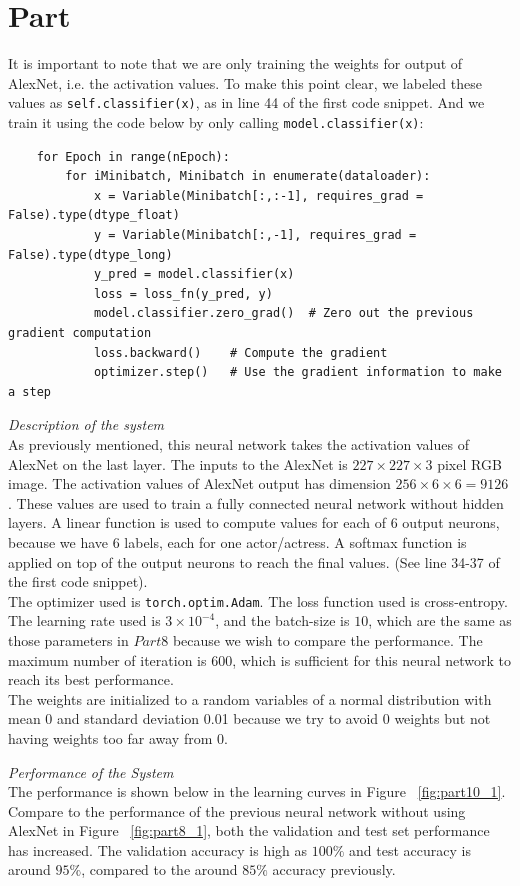 \documentclass{article}
\newcommand{\enterProblemHeader}[1]{
}
\newcommand{\exitProblemHeader}[1]{
}
\newcounter{homeworkProblemCounter} %
\newcommand{\homeworkProblemName}{}
\newenvironment{homeworkProblem}[1][Part \arabic{homeworkProblemCounter}]{ %
\stepcounter{homeworkProblemCounter} %
\renewcommand{\homeworkProblemName}{#1} %
\section{\homeworkProblemName} %
\enterProblemHeader{\homeworkProblemName} %
}{
\exitProblemHeader{\homeworkProblemName} %
}
\begin{document}
\begin{homeworkProblem}
It is important to note that we are only training the weights for output of AlexNet, i.e. the activation values. To make this point clear, we labeled these values as \texttt{self.classifier(x)}, as in line 44 of the first code snippet. And we train it using the code below by only calling \texttt{model.classifier(x)}:
\begin{lstlisting}
    for Epoch in range(nEpoch):
        for iMinibatch, Minibatch in enumerate(dataloader):
            x = Variable(Minibatch[:,:-1], requires_grad = False).type(dtype_float)
            y = Variable(Minibatch[:,-1], requires_grad = False).type(dtype_long)
            y_pred = model.classifier(x)
            loss = loss_fn(y_pred, y)
            model.classifier.zero_grad()  # Zero out the previous gradient computation
            loss.backward()    # Compute the gradient
            optimizer.step()   # Use the gradient information to make a step
\end{lstlisting}

\noindent \textit{Description of the system}
\\[5pt]
As previously mentioned, this neural network takes the activation values of AlexNet on the last layer. The inputs to the AlexNet is $227\times227\times3$ pixel RGB image. The activation values of AlexNet output has dimension $256\times6\times6 = 9126$. These values are used to train a fully connected neural network without hidden layers. A linear function is used to compute values for each of $6$ output neurons, because we have $6$ labels, each for one actor/actress. A softmax function is applied on top of the output neurons to reach the final values. (See line 34-37 of the first code snippet). 
\\
The optimizer used is \texttt{torch.optim.Adam}. The loss function used is cross-entropy.
\\
The learning rate used is $3\times10^{-4}$, and the batch-size is $10$, which are the same as those parameters in $Part 8$ because we wish to compare the performance. The maximum number of iteration is $600$, which is sufficient for this neural network to reach its best performance.
\\
The weights are initialized to a random variables of a normal distribution with mean 0 and standard deviation 0.01 because we try to avoid 0 weights but not having weights too far away from 0.

\clearpage

\noindent \textit{Performance of the System}
\\[5pt]
The performance is shown below in the learning curves in Figure ~\ref{fig:part10_1}. Compare to the performance of the previous neural network without using AlexNet in Figure ~\ref{fig:part8_1}, both the validation and test set performance has increased. The validation accuracy is high as $100\%$ and test accuracy is around $95\%$, compared to the around $85\%$ accuracy previously.


\end{homeworkProblem}
\end{document}

